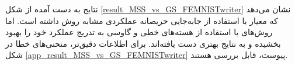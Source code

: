 نتایج به دست آمده از شکل
\ref{result_MSS_vs_GS_FEMNISTwriter}
نشان می‌دهد که معیار
با استفاده از جابه‌جایی حریصانه عملکردی مشابه روش
داشته است. اما روش‌های
با استفاده از هسته‌های خطی و گاوسی به تدریج عملکرد خود را بهبود بخشیده و به نتایج بهتری دست یافته‌اند. برای اطلاعات دقیق‌تر، منحنی‌های خطا در شکل
\ref{app_result_MSS_vs_GS_FEMNISTwriter}
پیوست، قابل بررسی هستند.



